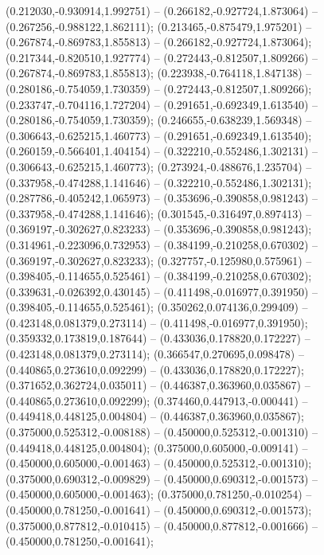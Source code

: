  (0.212030,-0.930914,1.992751) -- (0.266182,-0.927724,1.873064) -- (0.267256,-0.988122,1.862111);
 (0.213465,-0.875479,1.975201) -- (0.267874,-0.869783,1.855813) -- (0.266182,-0.927724,1.873064);
 (0.217344,-0.820510,1.927774) -- (0.272443,-0.812507,1.809266) -- (0.267874,-0.869783,1.855813);
 (0.223938,-0.764118,1.847138) -- (0.280186,-0.754059,1.730359) -- (0.272443,-0.812507,1.809266);
 (0.233747,-0.704116,1.727204) -- (0.291651,-0.692349,1.613540) -- (0.280186,-0.754059,1.730359);
 (0.246655,-0.638239,1.569348) -- (0.306643,-0.625215,1.460773) -- (0.291651,-0.692349,1.613540);
 (0.260159,-0.566401,1.404154) -- (0.322210,-0.552486,1.302131) -- (0.306643,-0.625215,1.460773);
 (0.273924,-0.488676,1.235704) -- (0.337958,-0.474288,1.141646) -- (0.322210,-0.552486,1.302131);
 (0.287786,-0.405242,1.065973) -- (0.353696,-0.390858,0.981243) -- (0.337958,-0.474288,1.141646);
 (0.301545,-0.316497,0.897413) -- (0.369197,-0.302627,0.823233) -- (0.353696,-0.390858,0.981243);
 (0.314961,-0.223096,0.732953) -- (0.384199,-0.210258,0.670302) -- (0.369197,-0.302627,0.823233);
 (0.327757,-0.125980,0.575961) -- (0.398405,-0.114655,0.525461) -- (0.384199,-0.210258,0.670302);
 (0.339631,-0.026392,0.430145) -- (0.411498,-0.016977,0.391950) -- (0.398405,-0.114655,0.525461);
 (0.350262,0.074136,0.299409) -- (0.423148,0.081379,0.273114) -- (0.411498,-0.016977,0.391950);
 (0.359332,0.173819,0.187644) -- (0.433036,0.178820,0.172227) -- (0.423148,0.081379,0.273114);
 (0.366547,0.270695,0.098478) -- (0.440865,0.273610,0.092299) -- (0.433036,0.178820,0.172227);
 (0.371652,0.362724,0.035011) -- (0.446387,0.363960,0.035867) -- (0.440865,0.273610,0.092299);
 (0.374460,0.447913,-0.000441) -- (0.449418,0.448125,0.004804) -- (0.446387,0.363960,0.035867);
 (0.375000,0.525312,-0.008188) -- (0.450000,0.525312,-0.001310) -- (0.449418,0.448125,0.004804);
 (0.375000,0.605000,-0.009141) -- (0.450000,0.605000,-0.001463) -- (0.450000,0.525312,-0.001310);
 (0.375000,0.690312,-0.009829) -- (0.450000,0.690312,-0.001573) -- (0.450000,0.605000,-0.001463);
 (0.375000,0.781250,-0.010254) -- (0.450000,0.781250,-0.001641) -- (0.450000,0.690312,-0.001573);
 (0.375000,0.877812,-0.010415) -- (0.450000,0.877812,-0.001666) -- (0.450000,0.781250,-0.001641);
